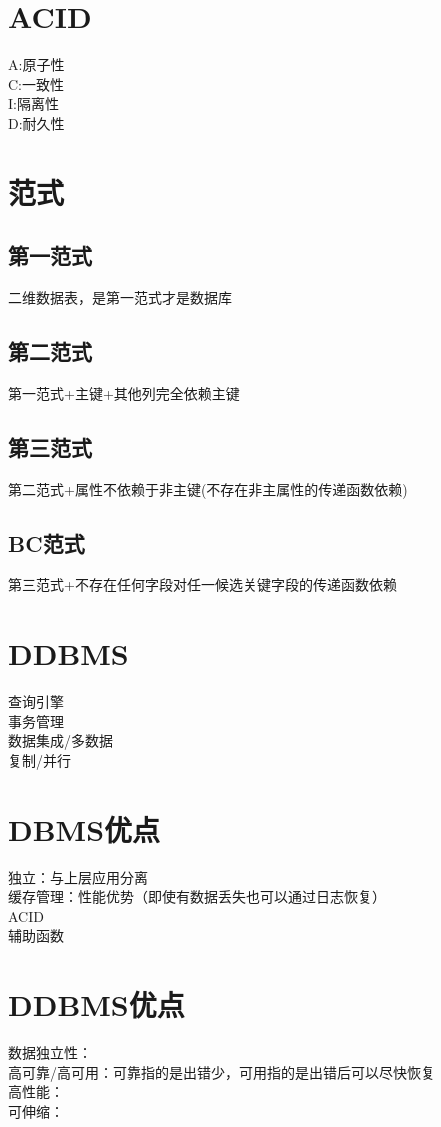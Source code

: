\documentclass{article}
\begin{document}
\begin{CJK}{UTF8}{gbsn}
	\section*{ACID}
	A:原子性\\
	C:一致性\\
	I:隔离性\\
	D:耐久性\\
	\section*{范式}
	\subsection*{第一范式}
	二维数据表，是第一范式才是数据库\\
	\subsection*{第二范式}
	第一范式+主键+其他列完全依赖主键\\
	\subsection*{第三范式}
	第二范式+属性不依赖于非主键(不存在非主属性的传递函数依赖)\\
	\subsection*{BC范式}
	第三范式+不存在任何字段对任一候选关键字段的传递函数依赖\\
	
	\section*{DDBMS}
	查询引擎\\
	事务管理\\
	数据集成/多数据\\
	复制/并行\\
	\section*{DBMS优点}
	独立：与上层应用分离\\
	缓存管理：性能优势（即使有数据丢失也可以通过日志恢复）\\
	ACID\\
	辅助函数\\
	\section*{DDBMS优点}
	数据独立性：\\
	高可靠/高可用：可靠指的是出错少，可用指的是出错后可以尽快恢复\\
	高性能：\\
	可伸缩：\\

\end{CJK}
\end{document}
